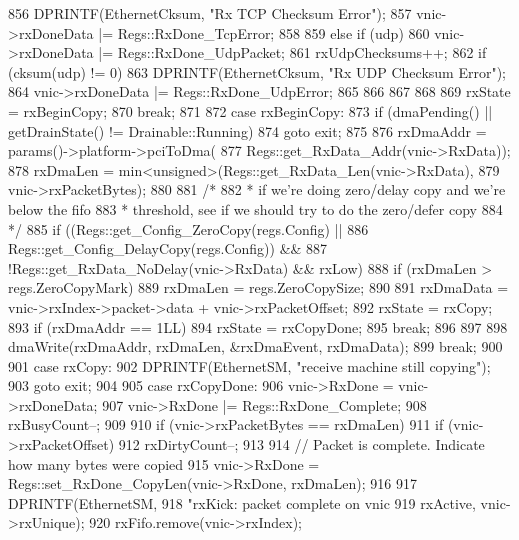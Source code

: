 \begin{DoxyCode}
{{{{{{856                         DPRINTF(EthernetCksum, "Rx TCP Checksum Error\n");
857                         vnic->rxDoneData |= Regs::RxDone_TcpError;
858                     }
859                 } else if (udp) {
860                     vnic->rxDoneData |= Regs::RxDone_UdpPacket;
861                     rxUdpChecksums++;
862                     if (cksum(udp) != 0) {
863                         DPRINTF(EthernetCksum, "Rx UDP Checksum Error\n");
864                         vnic->rxDoneData |= Regs::RxDone_UdpError;
865                     }
866                 }
867             }
868         }
869         rxState = rxBeginCopy;
870         break;
871 
872       case rxBeginCopy:
873         if (dmaPending() || getDrainState() != Drainable::Running)
874             goto exit;
875 
876         rxDmaAddr = params()->platform->pciToDma(
877                 Regs::get_RxData_Addr(vnic->RxData));
878         rxDmaLen = min<unsigned>(Regs::get_RxData_Len(vnic->RxData),
879                                  vnic->rxPacketBytes);
880 
881         /*
882          * if we're doing zero/delay copy and we're below the fifo
883          * threshold, see if we should try to do the zero/defer copy
884          */
885         if ((Regs::get_Config_ZeroCopy(regs.Config) ||
886              Regs::get_Config_DelayCopy(regs.Config)) &&
887             !Regs::get_RxData_NoDelay(vnic->RxData) && rxLow) {
888             if (rxDmaLen > regs.ZeroCopyMark)
889                 rxDmaLen = regs.ZeroCopySize;
890         }
891         rxDmaData = vnic->rxIndex->packet->data + vnic->rxPacketOffset;
892         rxState = rxCopy;
893         if (rxDmaAddr == 1LL) {
894             rxState = rxCopyDone;
895             break;
896         }
897 
898         dmaWrite(rxDmaAddr, rxDmaLen, &rxDmaEvent, rxDmaData);
899         break;
900 
901       case rxCopy:
902         DPRINTF(EthernetSM, "receive machine still copying\n");
903         goto exit;
904 
905       case rxCopyDone:
906         vnic->RxDone = vnic->rxDoneData;
907         vnic->RxDone |= Regs::RxDone_Complete;
908         rxBusyCount--;
909 
910         if (vnic->rxPacketBytes == rxDmaLen) {
911             if (vnic->rxPacketOffset)
912                 rxDirtyCount--;
913 
914             // Packet is complete.  Indicate how many bytes were copied
915             vnic->RxDone = Regs::set_RxDone_CopyLen(vnic->RxDone, rxDmaLen);
916 
917             DPRINTF(EthernetSM,
918                     "rxKick: packet complete on vnic %
919                     rxActive, vnic->rxUnique);
920             rxFifo.remove(vnic->rxIndex);
}}}
\end{DoxyCode}
